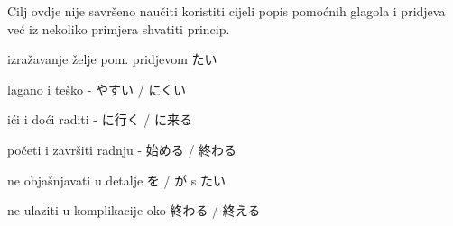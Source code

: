
\author{Tomislav Mamić}

	
	Cilj ovdje nije savršeno naučiti koristiti cijeli popis pomoćnih glagola i pridjeva već iz nekoliko primjera shvatiti princip.
	
	\begin{hyou}
		\item izražavanje želje pom. pridjevom たい
		\item lagano i teško - やすい / にくい
		\item ići i doći raditi - に行く / に来る
		\item početi i završiti radnju - 始める / 終わる
	\end{hyou}

	\begin{hyou}
		\item ne objašnjavati u detalje を / が s たい
		\item ne ulaziti u komplikacije oko 終わる / 終える
	\end{hyou}
